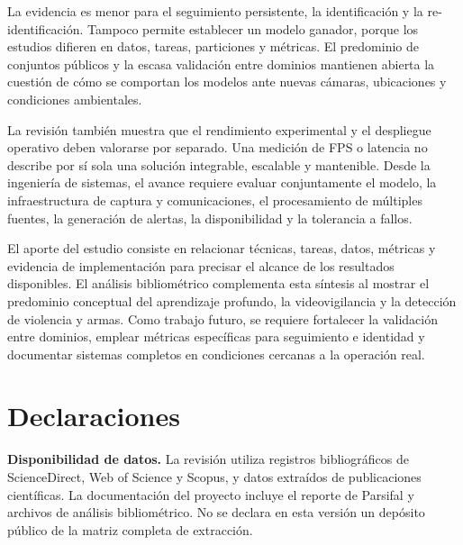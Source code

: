 \documentclass[pdflatex,sn-mathphys-num]{sn-jnl}%
\theoremstyle{thmstyleone}%
\theoremstyle{thmstyletwo}%
\theoremstyle{thmstylethree}%
\begin{document}
La evidencia es menor para el seguimiento persistente, la identificación y la re-identificación. Tampoco permite establecer un modelo ganador, porque los estudios difieren en datos, tareas, particiones y métricas. El predominio de conjuntos públicos y la escasa validación entre dominios mantienen abierta la cuestión de cómo se comportan los modelos ante nuevas cámaras, ubicaciones y condiciones ambientales.

La revisión también muestra que el rendimiento experimental y el despliegue operativo deben valorarse por separado. Una medición de FPS o latencia no describe por sí sola una solución integrable, escalable y mantenible. Desde la ingeniería de sistemas, el avance requiere evaluar conjuntamente el modelo, la infraestructura de captura y comunicaciones, el procesamiento de múltiples fuentes, la generación de alertas, la disponibilidad y la tolerancia a fallos.

El aporte del estudio consiste en relacionar técnicas, tareas, datos, métricas y evidencia de implementación para precisar el alcance de los resultados disponibles. El análisis bibliométrico complementa esta síntesis al mostrar el predominio conceptual del aprendizaje profundo, la videovigilancia y la detección de violencia y armas. Como trabajo futuro, se requiere fortalecer la validación entre dominios, emplear métricas específicas para seguimiento e identidad y documentar sistemas completos en condiciones cercanas a la operación real.

\backmatter
\section*{Declaraciones}

\noindent\textbf{Disponibilidad de datos.}
La revisión utiliza registros bibliográficos de ScienceDirect, Web of Science y Scopus, y datos extraídos de publicaciones científicas. La documentación del proyecto incluye el reporte de Parsifal y archivos de análisis bibliométrico. No se declara en esta versión un depósito público de la matriz completa de extracción.



\end{document}
